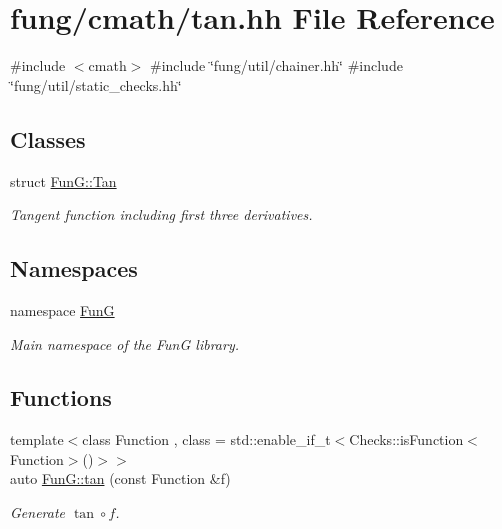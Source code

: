 \hypertarget{tan_8hh}{\section{fung/cmath/tan.hh \-File \-Reference}
\label{tan_8hh}
}
{\ttfamily \#include $<$cmath$>$}\*
{\ttfamily \#include \char`\"{}fung/util/chainer.\-hh\char`\"{}}\*
{\ttfamily \#include \char`\"{}fung/util/static\-\_\-checks.\-hh\char`\"{}}\*
\subsection*{\-Classes}
\begin{DoxyCompactItemize}
\item 
struct \hyperlink{structFunG_1_1Tan}{\-Fun\-G\-::\-Tan}
\begin{DoxyCompactList}\small\item\em \-Tangent function including first three derivatives. \end{DoxyCompactList}\end{DoxyCompactItemize}
\subsection*{\-Namespaces}
\begin{DoxyCompactItemize}
\item 
namespace \hyperlink{namespaceFunG}{\-Fun\-G}
\begin{DoxyCompactList}\small\item\em \-Main namespace of the \-Fun\-G library. \end{DoxyCompactList}\end{DoxyCompactItemize}
\subsection*{\-Functions}
\begin{DoxyCompactItemize}
\item 
{\footnotesize template$<$class Function , class  = std\-::enable\-\_\-if\-\_\-t$<$\-Checks\-::is\-Function$<$\-Function$>$()$>$$>$ }\\auto \hyperlink{group__CMathGroup_gae03f57bd4efb4449ad1dc60cb74c742d}{\-Fun\-G\-::tan} (const \-Function \&f)
\begin{DoxyCompactList}\small\item\em \-Generate $ \tan\circ f $. \end{DoxyCompactList}\end{DoxyCompactItemize}
